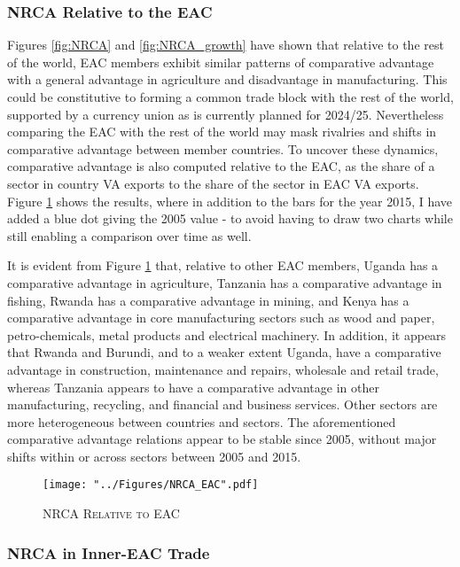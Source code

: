 \documentclass[a4paper]{article}
\begin{document}
\subsubsection{NRCA Relative to the EAC}
Figures \ref{fig:NRCA} and \ref{fig:NRCA_growth} have shown that relative to the rest of the world, EAC members exhibit similar patterns of comparative advantage with a general advantage in agriculture and disadvantage in manufacturing. This could be constitutive to forming a common trade block with the rest of the world, supported by a currency union as is currently planned for 2024/25. Nevertheless comparing the EAC with the rest of the world may mask rivalries and shifts in comparative advantage between member countries. To uncover these dynamics, comparative advantage is also computed relative to the EAC, as the share of a sector in country VA exports to the share of the sector in EAC VA exports. %
Figure \ref{fig:NRCA_EAC} shows the results, where in addition to the bars for the year 2015, I have added a blue dot giving the 2005 value - to avoid having to draw two charts while still enabling a comparison over time as well. \newline 

It is evident from Figure \ref{fig:NRCA_EAC} that, relative to other EAC members, Uganda has a comparative advantage in agriculture, Tanzania has a comparative advantage in fishing, Rwanda has a comparative advantage in mining, and Kenya has a comparative advantage in core manufacturing sectors such as wood and paper, petro-chemicals, metal products and electrical machinery. In addition, it appears that Rwanda and Burundi, and to a weaker extent Uganda, have a comparative advantage in construction, maintenance and repairs, wholesale and retail trade, whereas Tanzania appears to have a comparative advantage in other manufacturing, recycling, and financial and business services. Other sectors are more heterogeneous between countries and sectors. The aforementioned comparative advantage relations appear to be stable since 2005, without major shifts within or across sectors between 2005 and 2015. 

\begin{figure}[h!]
\centering
\caption{\label{fig:NRCA_EAC}\textsc{NRCA Relative to EAC}}
\texttt{[image: "../Figures/NRCA\_EAC".pdf]} %
\end{figure}
\FloatBarrier

\subsubsection{NRCA in Inner-EAC Trade}
\end{document}
